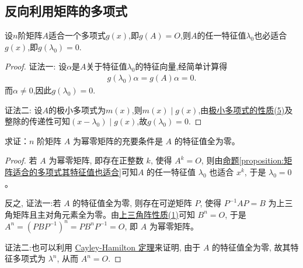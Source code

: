 \documentclass[../../main.tex]{subfiles}
\begin{document}
\subsection{反向利用矩阵的多项式}

\begin{proposition}\label{proposition:矩阵适合的多项式其特征值也适合}
设$n$阶矩阵$A$适合一个多项式$g(x)$,即$g(A) = O$,则$A$的任一特征值$\lambda_0$也必适合$g(x)$,即$g(\lambda_0) = 0$.
\end{proposition}
\begin{proof}
{\color{blue}证法一:}
设$\alpha$是$A$关于特征值$\lambda_0$的特征向量,经简单计算得
\begin{align*}
g(\lambda_0) \alpha = g(A) \alpha = 0.
\end{align*}
而$\alpha \neq 0$,因此$g(\lambda_0) = 0$.

{\color{blue}证法二:}
设$A$的极小多项式为$m(x)$,则$m(x)\mid g(x)$,由\hyperref[proposition:极小多项式的性质]{极小多项式的性质(5)}及整除的传递性可知$(x-\lambda_0)\mid g(x)$,故$g(\lambda_0)=0.$

\end{proof}

\begin{proposition}[幂零矩阵关于特征值的充要条件]\label{proposition:幂零矩阵关于特征值的充要条件}
求证：$n$ 阶矩阵 $A$ 为幂零矩阵的充要条件是 $A$ 的特征值全为零。
\end{proposition}
\begin{proof}
若 $A$ 为幂零矩阵, 即存在正整数 $k$, 使得 $A^k = O$, 则由\hyperref[proposition:矩阵适合的多项式其特征值也适合]{命题\ref{proposition:矩阵适合的多项式其特征值也适合}}可知$A$ 的任一特征值 $\lambda_0$ 也适合 $x^k$, 于是 $\lambda_0 = 0$。

反之,
{\color{blue}证法一:}若 $A$ 的特征值全为零, 则存在可逆矩阵 $P$, 使得 $P^{-1}AP = B$ 为上三角矩阵且主对角元素全为零。由\hyperref[proposition:上三角阵性质]{上三角阵性质(1)}可知 $B^n = O$, 于是 $A^n = (PBP^{-1})^n = PB^nP^{-1} = O$, 即 $A$ 为幂零矩阵。

{\color{blue}证法二:}也可以利用 \hyperref[theorem:Cayley-Hamilton定理]{Cayley-Hamilton 定理}来证明, 由于 $A$ 的特征值全为零, 故其特征多项式为 $\lambda^n$, 从而 $A^n = O$.

\end{proof}
\end{document}
